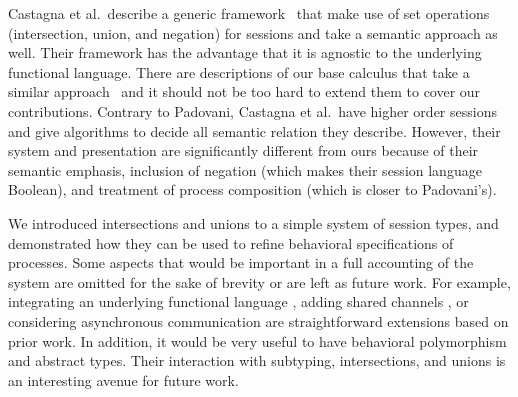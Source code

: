 \documentclass[submission,copyright,creativecommons]{eptcs}
\begin{document}
Castagna et al.\ describe a generic framework~\cite{CastagnaDGP09} that make use of set operations (intersection, union, and negation) for sessions and take a semantic approach as well. Their framework has the advantage that it is agnostic to the underlying functional language. There are descriptions of our base calculus that take a similar approach~\cite{ToninhoCP13} and it should not be too hard to extend them to cover our contributions. Contrary to Padovani, Castagna et al.\ have higher order sessions and give algorithms to decide all semantic relation they describe. However, their system and presentation are significantly different from ours because of their semantic emphasis, inclusion of negation (which makes their session language Boolean), and treatment of process composition (which is closer to Padovani's).

We introduced intersections and unions to a simple system of session types, and demonstrated how they can be used to refine behavioral specifications of processes. Some aspects that would be important in a full accounting of the system are omitted for the sake of brevity or are left as future work. For example, integrating an underlying functional language \cite{ToninhoCP13}, adding shared channels \cite{CairesP10,PfenningG15}, or considering asynchronous communication \cite{DeYoungCPT12,PfenningG15,Griffith16phd} are straightforward extensions based on prior work. In addition, it would be very useful to have behavioral polymorphism \cite{CairesPPT13} and abstract types. Their interaction with subtyping, intersections, and unions is an interesting avenue for future work.








\end{document}
